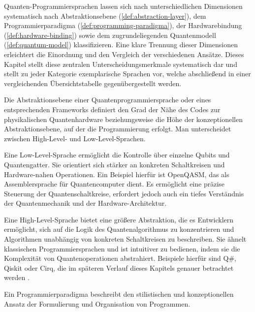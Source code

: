 Quanten-Programmiersprachen lassen sich nach unterschiedlichen Dimensionen systematisch nach Abstraktionsebene (\autoref{def:abstraction-layer}), dem Programmierparadigma (\autoref{def:programming-paradigma}), der Hardwarebindung (\autoref{def:hardware-binding}) sowie dem zugrundeliegenden Quantenmodell (\autoref{def:quantum-model}) klassifizieren. Eine klare Trennung dieser Dimensionen erleichtert die Einordnung und den Vergleich der verschiedenen Ansätze. Dieses Kapitel stellt diese zentralen Unterscheidungsmerkmale systematisch dar und stellt zu jeder Kategorie exemplarische Sprachen vor, welche abschließend in einer vergleichenden Übersichtstabelle gegenübergestellt werden.

\begin{defn}[Abstraktionsebene]
\label{def:abstraction-layer}
Die Abstraktionsebene einer Quantenprogrammiersprache oder eines entsprechenden Frameworks definiert den Grad der Nähe des Codes zur physikalischen Quantenhardware beziehungsweise die Höhe der konzeptionellen Abstraktionsebene, auf der die Programmierung erfolgt. Man unterscheidet zwischen High-Level- und Low-Level-Sprachen.
\end{defn}

\begin{defn}
\label{def:low-level-lang}
Eine Low-Level-Sprache ermöglicht die Kontrolle über einzelne Qubits und Quantengatter. Sie orientiert sich stärker an konkreten Schaltkreisen und Hardware-nahen Operationen. Ein Beispiel hierfür ist OpenQASM, das als Assemblersprache für Quantencomputer dient. Es ermöglicht eine präzise Steuerung der Quantenschaltkreise, erfordert jedoch auch ein tiefes Verständnis der Quantenmechanik und der Hardware-Architektur. \autocite{cross_open_2017}
\end{defn}

\begin{defn}
\label{def:high-level}
Eine High-Level-Sprache bietet eine größere Abstraktion, die es Entwicklern ermöglicht, sich auf die Logik des Quantenalgorithmus zu konzentrieren und Algorithmen unabhängig von konkreten Schaltkreisen zu beschreiben. Sie ähnelt klassischen Programmiersprachen und ist intuitiver zu bedienen, indem sie die Komplexität von Quantenoperationen abstrahiert. Beispiele hierfür sind Q\#, Qiskit oder Cirq, die im späteren Verlauf dieses Kapitels genauer betrachtet werden \autocite{singhSurveyAvailableTools2024a}.
\end{defn}

\begin{defn}[Programmierparadigma]
\label{def:programming-paradigma}
Ein Programmierparadigma beschreibt den stilistischen und konzeptionellen Ansatz der Formulierung und Organisation von Programmen.
\end{defn}

